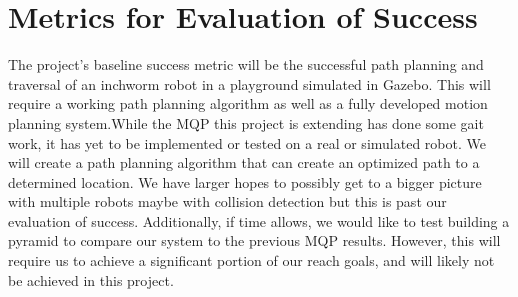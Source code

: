 \section{Metrics for Evaluation of Success}
The project’s baseline success metric will be the successful path planning and traversal of an inchworm robot in a playground simulated in Gazebo. This will require a working path planning algorithm as well as a fully developed motion planning system.While the MQP this project is extending has done some gait work, it has yet to be implemented or tested on a real or simulated robot. We will create a path planning algorithm that can create an optimized path to a determined location. We have larger hopes to possibly get to a bigger picture with multiple robots maybe with collision detection but this is past our evaluation of success. Additionally, if time allows, we would like to test building a pyramid to compare our system to the previous MQP results. However, this will require us to achieve a significant portion of our reach goals, and will likely not be achieved in this project.